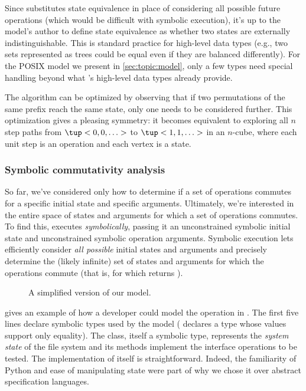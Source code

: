 Since  substitutes state equivalence in place of
considering all possible future operations (which would be difficult
with symbolic execution), it's up to the model's author to define
state equivalence as whether two states are externally
indistinguishable.  This is standard practice for high-level data
types (e.g., two sets represented as trees could be equal even if they
are balanced differently).  For the POSIX model we present in
\cref{sec:topic:model}, only a few types need special handling beyond what
\analyzer's high-level data types already provide.

The  algorithm can be optimized by observing that if
two permutations of the same prefix reach the same state, only one
needs to be considered further.  This optimization gives
 a pleasing symmetry: it becomes equivalent to
exploring all $n$ step paths from $\tup<0,0,\ldots>$ to
$\tup<1,1,\ldots>$ in an $n$-cube, where each unit step is an
operation and each vertex is a state.


\subsubsection{Symbolic commutativity analysis}
\label{sec:topic:rename-conditions}

So far, we've considered only how to determine if a set of operations
commutes for a specific initial state and specific arguments.
Ultimately, we're interested in the entire space of states and
arguments for which a set of operations commutes.  To find this,
\analyzer executes  \emph{symbolically}, passing it an
unconstrained symbolic initial state and unconstrained symbolic
operation arguments.  Symbolic execution lets \analyzer efficiently
consider \emph{all possible} initial states and arguments and
precisely determine the (likely infinite) set of states and arguments
for which the operations commute (that is, for which 
returns ).

\begin{figure}
  \caption{A simplified version of our  model.}
  \label{fig:rename-spec}
\end{figure}

 gives an example of how a developer could model
the  operation in \analyzer.  The first five lines
declare symbolic types used by the model (
declares a type whose values support only equality).  The 
class, itself a symbolic type, represents the \emph{system state} of
the file system and its methods implement the interface operations to
be tested.  The implementation of  itself is
straightforward.  Indeed, the familiarity of Python and ease of
manipulating state were part of why we chose it over abstract
specification languages.

